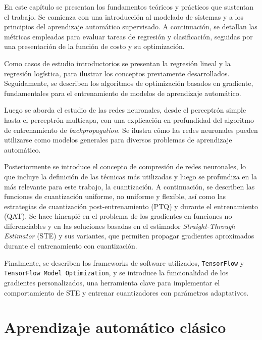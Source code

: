 En este capítulo se presentan los fundamentos teóricos y prácticos que sustentan el trabajo. Se comienza con una introducción al modelado de sistemas y a los principios del aprendizaje automático supervisado. A continuación, se detallan las métricas empleadas para evaluar tareas de regresión y clasificación, seguidas por una presentación de la función de costo y su optimización.

Como casos de estudio introductorios se presentan la regresión lineal y la regresión logística, para ilustrar los conceptos previamente desarrollados. Seguidamente, se describen los algoritmos de optimización basados en gradiente, fundamentales para el entrenamiento de modelos de aprendizaje automático.

Luego se aborda el estudio de las redes neuronales, desde el perceptrón simple hasta el perceptrón multicapa, con una explicación en profundidad del algoritmo de entrenamiento de \textit{backpropagation}. Se ilustra cómo las redes neuronales pueden utilizarse como modelos generales para diversos problemas de aprendizaje automático.

Posteriormente se introduce el concepto de compresión de redes neuronales, lo que incluye la definición de las técnicas más utilizadas y luego se profundiza en la más relevante para este trabajo, la cuantización. A continuación, se describen las funciones de cuantización uniforme, no uniforme y flexible, así como las estrategias de cuantización post-entrenamiento (PTQ) y durante el entrenamiento (QAT). Se hace hincapié en el problema de los gradientes en funciones no diferenciables y en las soluciones basadas en el estimador \textit{Straight-Through Estimator} (STE) y sus variantes, que permiten propagar gradientes aproximados durante el entrenamiento con cuantización.

Finalmente, se describen los frameworks de software utilizados, \texttt{TensorFlow} y \texttt{TensorFlow Model Optimization}, y se introduce la funcionalidad de los gradientes personalizados, una herramienta clave para implementar el comportamiento de STE y entrenar cuantizadores con parámetros adaptativos.

\section{Aprendizaje automático clásico}
\label{sec:aprendizaje_automatico_clasico}







% 


